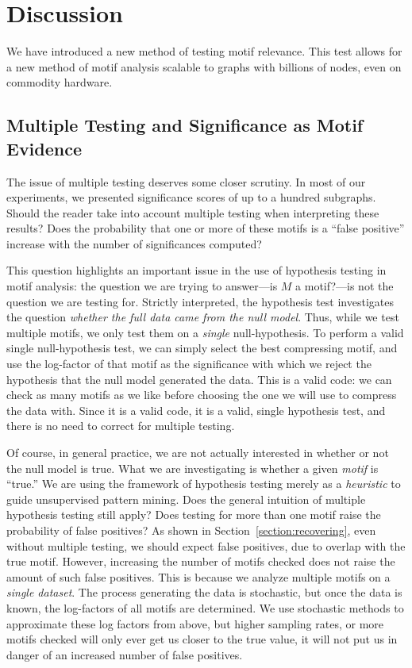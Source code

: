 \documentclass[twoside,11pt]{article}
\begin{document}
\section{Discussion}

We have introduced a new method of testing motif relevance. This test allows for a new method of motif analysis scalable to graphs with billions of nodes, even on commodity hardware. 

\subsection{Multiple Testing and Significance as Motif Evidence}
\label{section:multiple-testing}

The issue of multiple testing deserves some closer scrutiny. In most of our experiments, we presented significance scores of up to a hundred subgraphs. Should the reader take into account multiple testing when interpreting these results? Does the probability that one or more of these motifs is a ``false positive'' increase with the number of significances computed?

This question highlights an important issue in the use of hypothesis testing in motif analysis: the question we are trying to answer---is $M$ a motif?---is not the question we are testing for. Strictly interpreted, the hypothesis test investigates the question \emph{whether the full data came from the null model}. Thus, while we test multiple motifs, we only test them on a \emph{single} null-hypothesis. To perform a valid single null-hypothesis test, we can simply select the best compressing motif, and use the log-factor of that motif as the significance with which we reject the hypothesis that the null model generated the data. This is a valid code: we can check as many motifs as we like before choosing the one we will use to compress the data with. Since it is a valid code, it is a valid, single hypothesis test, and there is no need to correct for multiple testing.

Of course, in general practice, we are not actually interested in whether or not the null model is true. What we are investigating is whether a given \emph{motif} is ``true.'' We are using the framework of hypothesis testing merely as a \emph{heuristic} to guide unsupervised pattern mining. Does the general intuition of multiple hypothesis testing still apply? Does testing for more than one motif raise the probability of false positives? As shown in Section~\ref{section:recovering}, even without multiple testing, we should expect false positives, due to overlap with the true motif. However, increasing the number of motifs checked does not raise the amount of such false positives. This is because we analyze multiple motifs on a \emph{single dataset}. The process generating the data is stochastic, but once the data is known, the log-factors of all motifs are determined. We use stochastic methods to approximate these log factors from above, but higher sampling rates, or more motifs checked will only ever get us closer to the true value, it will not put us in danger of an increased number of false positives.
\end{document}
